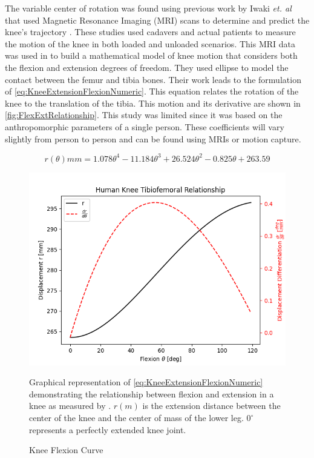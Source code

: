 The variable center of rotation was found using previous work by Iwaki \textit{et. al} that used Magnetic Resonance Imaging (MRI) scans to determine and predict the knee's trajectory \cite{MRIKneeShape_Loaded, MRIKneeShape_Unloaded}. These studies used cadavers and actual patients to measure the motion of the knee in both loaded and unloaded scenarios. This MRI data was used in \cite{KinDynKneeJoint} to build a mathematical model of knee motion that considers both the flexion and extension degrees of freedom. They used ellipse to model the contact between the femur and tibia bones. Their work leads to the formulation of \autoref{eq:KneeExtensionFlexionNumeric}. This equation relates the rotation of the knee to the translation of the tibia. This motion and its derivative are shown in \autoref{fig:FlexExtRelationship}. This study was limited since it was based on the anthropomorphic parameters of a single person. These coefficients will vary slightly from person to person and can be found using MRIs or motion capture. 


\begin{equation}
    r(\theta) mm = 1.078\theta^4 - 11.184\theta^3 + 26.524\theta^2 - 0.825\theta + 263.59
    \label{eq:KneeExtensionFlexionNumeric}
\end{equation}

\begin{figure}[ht!]
    \centering
    \includegraphics[scale=0.9]{images/mech_design/FlexionCurve.png}
    \caption{Knee Flexion Curve}{Graphical representation of \autoref{eq:KneeExtensionFlexionNumeric} demonstrating the relationship between flexion and extension in a knee as measured by \cite{KinDynKneeJoint}. \(r(m)\) is the extension distance between the center of the knee and the center of mass of the lower leg. $0^\circ$ represents a perfectly extended knee joint.}
    \label{fig:FlexExtRelationship}
\end{figure} 

